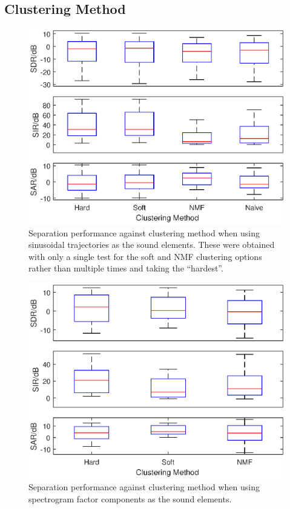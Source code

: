 \documentclass[12pt,a4paper,twoside,openright]{report}
\begin{document}
\subsection{Clustering Method}


\begin{figure}
\centering
\includegraphics[width=0.7\linewidth]{./ClusteringCompBoxPlotsSin}
\caption[Separation performance against clustering method when using sinusoidal trajectories as the sound elements.]{Separation performance against clustering method when using sinusoidal trajectories as the sound elements. These were obtained with only a single test for the soft and NMF clustering options rather than multiple times and taking the ``hardest''.}
\label{fig:ClusteringCompBoxPlotsSin}
\end{figure}

\begin{figure}
\centering
\includegraphics[width=0.7\linewidth]{./ClusteringCompBoxPlotsMat}
\caption{Separation performance against clustering method when using spectrogram factor components as the sound elements.}
\label{fig:ClusteringCompBoxPlotsMat}
\end{figure}
\end{document}
